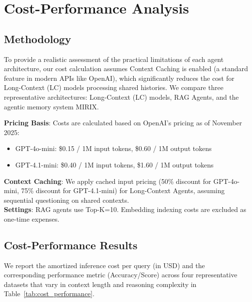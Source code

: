 \section{Cost-Performance Analysis}
\label{app:cost_performance}

\subsection{Methodology}
To provide a realistic assessment of the practical limitations of each agent architecture, our cost calculation assumes Context Caching is enabled (a standard feature in modern APIs like OpenAI), which significantly reduces the cost for Long-Context (LC) models processing shared histories. We compare three representative architectures: Long-Context (LC) models, RAG Agents, and the agentic memory system MIRIX.

\noindent \textbf{Pricing Basis}: Costs are calculated based on OpenAI's pricing as of November 2025:
\begin{itemize}
    \item GPT-4o-mini: \$0.15 / 1M input tokens, \$0.60 / 1M output tokens
    \item GPT-4.1-mini: \$0.40 / 1M input tokens, \$1.60 / 1M output tokens
\end{itemize}
\noindent \textbf{Context Caching}: We apply cached input pricing (50\% discount for GPT-4o-mini, 75\% discount for GPT-4.1-mini) for Long-Context Agents, assuming sequential questioning on shared contexts. \\
\noindent \textbf{Settings}: RAG agents use Top-K=10. Embedding indexing costs are excluded as one-time expenses.

\subsection{Cost-Performance Results}
We report the amortized inference cost per query (in USD) and the corresponding performance metric (Accuracy/Score) across four representative datasets that vary in context length and reasoning complexity in Table~\ref{tab:cost_performance}.

